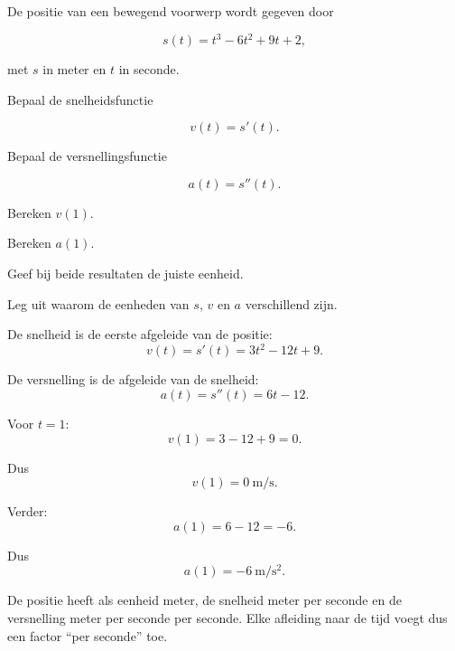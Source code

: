 \documentclass{ximera}
\begin{document}
\begin{oefening}{\oefU\ESS}

De positie van een bewegend voorwerp wordt gegeven door

\[
s(t)=t^3-6t^2+9t+2,
\]

met $s$ in meter en $t$ in seconde.

\begin{question}
Bepaal de snelheidsfunctie

\[
v(t)=s'(t).
\]
\end{question}

\begin{question}
Bepaal de versnellingsfunctie

\[
a(t)=s''(t).
\]
\end{question}

\begin{question}
Bereken $v(1)$.
\end{question}

\begin{question}
Bereken $a(1)$.
\end{question}

\begin{question}
Geef bij beide resultaten de juiste eenheid.
\end{question}

\begin{question}
Leg uit waarom de eenheden van $s$, $v$ en $a$ verschillend zijn.
\end{question}

\begin{oplossing}

De snelheid is de eerste afgeleide van de positie:
\[
v(t)=s'(t)=3t^2-12t+9.
\]

De versnelling is de afgeleide van de snelheid:
\[
a(t)=s''(t)=6t-12.
\]

Voor $t=1$:
\[
v(1)=3-12+9=0.
\]

Dus
\[
\boxed{v(1)=0\ \mathrm{m/s}}.
\]

Verder:
\[
a(1)=6-12=-6.
\]

Dus
\[
\boxed{a(1)=-6\ \mathrm{m/s^2}}.
\]

De positie heeft als eenheid meter, de snelheid meter per seconde en de
versnelling meter per seconde per seconde. Elke afleiding naar de tijd voegt
dus een factor ``per seconde'' toe.

\end{oplossing}

\end{oefening}
\end{document}
